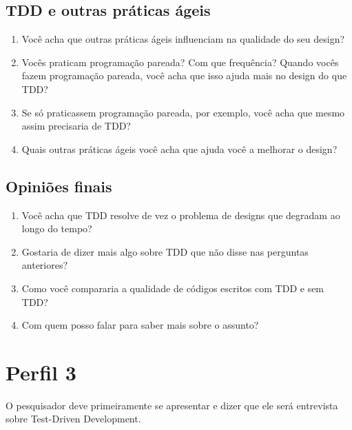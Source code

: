 \subsection{TDD e outras práticas ágeis}
\label{entrevista:tdd-e-praticas-ageis}

\begin{enumerate}
	\item Você acha que outras práticas ágeis influenciam na qualidade do seu design?

	\item Vocês praticam programação pareada? Com que frequência? Quando vocês
	fazem programação pareada, você acha que isso ajuda mais no design do que TDD?

	\item Se só praticassem programação pareada, por exemplo, você acha que mesmo
	assim precisaria de TDD?

	\item Quais outras práticas ágeis você acha que ajuda você a melhorar o design?
\end{enumerate}

\subsection{Opiniões finais}

\begin{enumerate}
	\item Você acha que TDD resolve de vez o problema de designs que degradam ao longo do tempo?

	\item Gostaria de dizer mais algo sobre TDD que não disse nas perguntas anteriores?
	
	\item Como você compararia a qualidade de códigos escritos com TDD e sem TDD? 

	\item Com quem posso falar para saber mais sobre o assunto?
\end{enumerate}


\section{Perfil 3}

O pesquisador deve primeiramente se apresentar e dizer que ele será entrevista
sobre Test-Driven Development.


